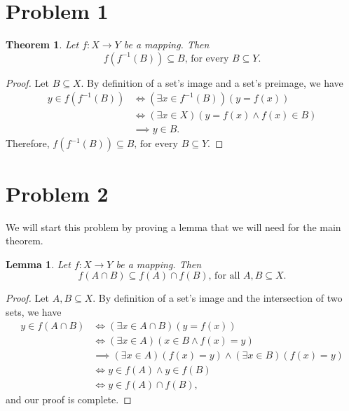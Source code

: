 \documentclass[12pt,a4paper]{article}
\author{Jeremiah Givens}
\theoremstyle{theorem}
\newtheorem{theorem}{Theorem}
\newtheorem{lemma}{Lemma}
\theoremstyle{definition}
\begin{document}
\section*{Problem 1}
\begin{theorem}
Let $f:X \to Y$ be a mapping.  Then
\begin{equation*}
f(f^{-1}(B)) \subseteq B \text{,  for every } B \subseteq Y \text{.}
\end{equation*}
\end{theorem}

\begin{proof}
Let $B \subseteq X$.  By definition of a set's image and a set's preimage,  we have
\begin{align*}
y \in f(f^{-1}(B)) &\iff (\exists x \in f^{-1}(B))(y = f(x))\\
&\iff (\exists x \in X)(y = f(x) \land f(x) \in B)\\
&\implies y \in B \text{.}
\end{align*}
Therefore,  $f(f^{-1}(B)) \subseteq B \text{,  for every } B \subseteq	 Y$.
\end{proof}

\section*{Problem 2} We will start this problem by proving a lemma that we will need for the main theorem.

\begin{lemma}
Let $f:X \to Y$ be a mapping.  Then
\begin{equation*}
f(A \cap B) \subseteq f(A) \cap f(B) \text{,  for all } A,B \subseteq X \text{.}
\end{equation*}
\end{lemma}

\begin{proof}
Let $A,  B \subseteq X$.  By definition of a set's image and the intersection of two sets,  we have
\begin{align*}
y \in f(A \cap B) &\iff (\exists x \in A \cap B)(y = f(x))\\
&\iff (\exists x \in A)(x \in B \land f(x) = y)\\
&\implies (\exists x \in A)(f(x) = y) \land (\exists x \in B)(f(x) = y)\\
&\iff y \in f(A) \land y \in f(B)\\
&\iff y \in f(A) \cap f(B)\text{,}
\end{align*}
and our proof is complete.
\end{proof}
\end{document}
